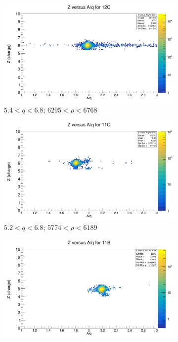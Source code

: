 \documentclass[12pt, letterpaper]{article}
\begin{document}
\begin{figure}[!htbp]
\begin{subfigure}{.5\textwidth}
  \centering
  \includegraphics[width=.9\linewidth]{z_vs_aq_12c.png}  
  \caption{$5.4 < q < 6.8$; $6295 < \rho < 6768$}
  \label{fig:sub-first}
\end{subfigure}
\begin{subfigure}{.5\textwidth}
  \centering
  \includegraphics[width=.9\linewidth]{z_vs_aq_11c.png} 
  \caption{$5.2 < q < 6.8$; $ 5774 < \rho < 6189$}
  \label{fig:sub-second}
\end{subfigure}
\begin{subfigure}{.5\textwidth}
  \centering
  \includegraphics[width=.9\linewidth]{z_vs_aq_11b.png} 

\end{subfigure}
\end{figure}
\end{document}
